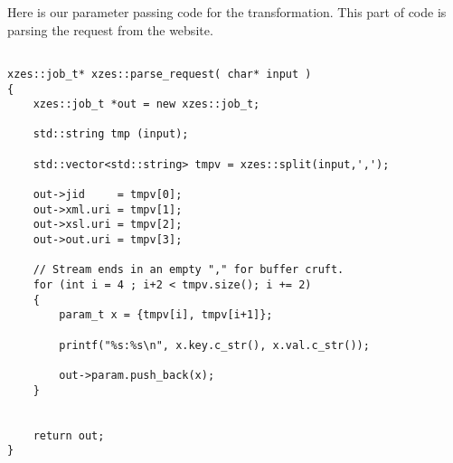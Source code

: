 Here is our parameter passing code for the transformation.
This part of code is parsing the request from the website.
\begin{lstlisting}

xzes::job_t* xzes::parse_request( char* input )
{
    xzes::job_t *out = new xzes::job_t;

    std::string tmp (input);

    std::vector<std::string> tmpv = xzes::split(input,',');

    out->jid     = tmpv[0];
    out->xml.uri = tmpv[1];
    out->xsl.uri = tmpv[2];
    out->out.uri = tmpv[3];

    // Stream ends in an empty "," for buffer cruft.
    for (int i = 4 ; i+2 < tmpv.size(); i += 2)
    {
        param_t x = {tmpv[i], tmpv[i+1]};

        printf("%s:%s\n", x.key.c_str(), x.val.c_str());

        out->param.push_back(x);
    }


    return out;
}

\end{lstlisting}
